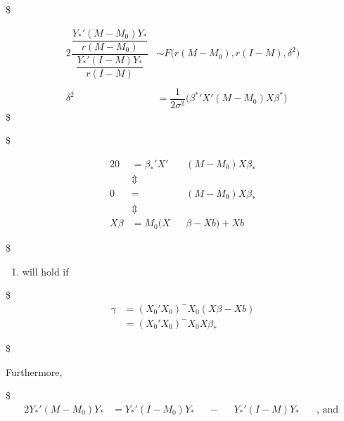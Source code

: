 \documentclass[
]{book}
\providecommand{\tightlist}{%
  \setlength{\itemsep}{0pt}\setlength{\parskip}{0pt}}
\begin{document}
{{{\$

\begin{alignat}{2}

\dfrac
{\dfrac{ Y_\ast ' (M-M_0) Y_\ast }{ r(M-M_0)}}
{\dfrac{ Y_\ast ' (I-M) Y_\ast }{r(I-M)}}

&\sim F \Big( r(M-M_0), r(I-M), \delta^2 \Big)

\\
\\

\delta^2 &=\dfrac{1}{2 \sigma^2} \Big( {\beta^\ast} ' X ' (M-M_0) X \beta^\ast \Big) \tag{non-centrality parameter}


\end{alignat}
\$

\$

\begin{alignat}{2}

0 &= \beta_\ast '  X' &&(M-M_0) X \beta_\ast


\\


&\Updownarrow   

\\


0 &= &&(M-M_0)X \beta_\ast

\\

&\Updownarrow   


\\

X\beta & = M_0 (X &&\beta - X b) + Xb \tag{3}

\end{alignat}

\$

\begin{enumerate}
\def\labelenumi{(\arabic{enumi})}
\setcounter{enumi}{2}
\tightlist
\item
  will hold if
\end{enumerate}

\$
\begin{align}
\gamma &= (X_0 ' X_0)^- X_0(X \beta - Xb) \\

&= (X_0 ' X_0)^- X_0 X \beta_\ast 

\end{align}

\$

Furthermore,

\$
\begin{alignat}{2}
Y_\ast ' (M-M_0)Y_\ast &= 


Y_\ast ' (I-M_0)Y_\ast &&- &&Y_\ast ' (I-M)Y_\ast  \; \; \; \; \;\text{ , and }





\end{alignat}}}}
\end{document}
